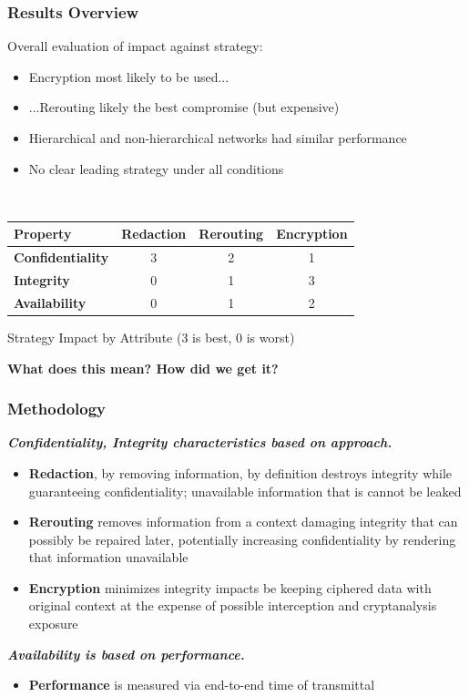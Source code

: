 \documentclass[t,handout]{beamer}
\begin{document}
\begin{frame}
\frametitle{Results Overview}
Overall evaluation of impact against strategy:
\begin{itemize}
\item {\small Encryption most likely to be used...}
\item {\small ...Rerouting likely the best compromise (but expensive)}
\item {\small Hierarchical and non-hierarchical networks had similar performance}
\item {\small No clear leading strategy under all conditions}
\end{itemize}
~\\
\centering %
\begin{tabular}{lccc}
\toprule %
{\bf Property}			& {\bf Redaction}	& {\bf Rerouting} 	& {\bf Encryption} 	\\\toprule
{\bf Confidentiality} 	& 3				  	& 2					& 1				 	\\\midrule
{\bf Integrity}			& 0					& 1					& 3 					\\\midrule
{\bf Availability}		& 0					& 1					& 2					\\\bottomrule
\end{tabular}
\label{table:model:evaluation}
\begin{center}
{\scriptsize Strategy Impact by Attribute (3 is best, 0 is worst)}
\end{center}
\begin{center}
{\bf What does this mean? How did we get it?}
\end{center}
\end{frame}

\begin{frame}
\frametitle{Methodology}
{\bf \textit{Confidentiality, Integrity characteristics based on approach.}} \\
\begin{itemize}
\item {\small {\bf Redaction}, by removing information, by definition destroys integrity while guaranteeing confidentiality; unavailable information that is cannot be leaked}
\item {\small {\bf Rerouting} removes information from a context damaging integrity that can possibly be repaired later, potentially increasing confidentiality by rendering that information unavailable}
\item {\small {\bf Encryption} minimizes integrity impacts be keeping ciphered data with original context at the expense of possible interception and cryptanalysis exposure}
\end{itemize}
{\bf \textit{Availability is based on performance.}} \\
\begin{itemize}
\item {\small {\bf Performance} is measured via end-to-end time of transmittal}
\end{itemize}
\end{frame}
\end{document}
